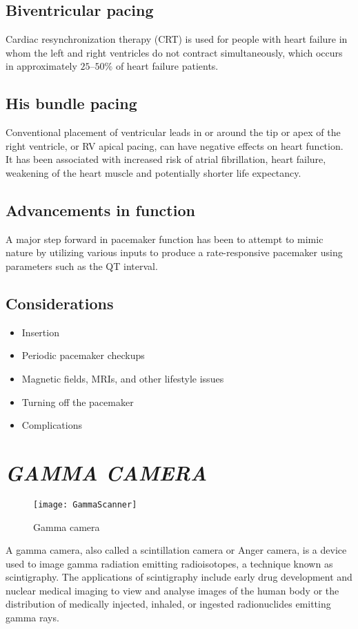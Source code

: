 \documentclass[12pt]{article}
\begin{document}
\subsection{Biventricular pacing}

Cardiac resynchronization therapy (CRT) is used for people with heart failure in whom the left and right ventricles do not contract simultaneously, which occurs in approximately $25–50\%$ of heart failure patients.

\subsection{His bundle pacing}

Conventional placement of ventricular leads in or around the tip or apex of the right ventricle, or RV apical pacing, can have negative effects on heart function. It has been associated with increased risk of atrial fibrillation, heart failure, weakening of the heart muscle and potentially shorter life expectancy.

\subsection{Advancements in function}

A major step forward in pacemaker function has been to attempt to mimic nature by utilizing various inputs to produce a rate-responsive pacemaker using parameters such as the QT interval.

\subsection{Considerations}
\begin{itemize}
\item Insertion
\item Periodic pacemaker checkups
\item Magnetic fields, MRIs, and other lifestyle issues
\item Turning off the pacemaker
\item Complications
\end{itemize}

\section {\textsl{GAMMA CAMERA}}
\begin{figure}
\centering
\texttt{[image: GammaScanner]}
\caption{Gamma camera}

\end{figure}
A gamma camera, also called a scintillation camera or Anger camera, is a device used to image gamma radiation emitting radioisotopes, a technique known as scintigraphy.\newline\newline
The applications of scintigraphy include early drug development and nuclear medical imaging to view and analyse images of the human body or the distribution of medically injected, inhaled, or ingested radionuclides emitting gamma rays.
\end{document}
